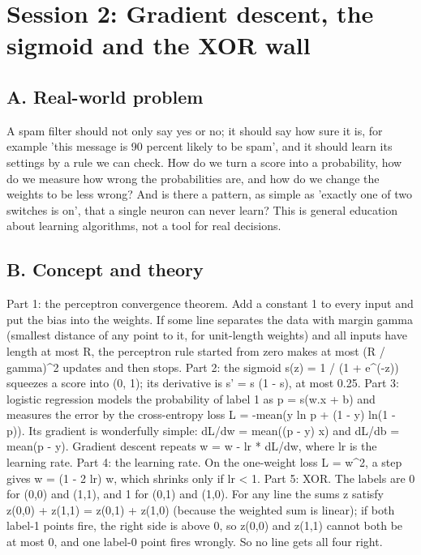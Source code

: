 \documentclass[11pt,a4paper]{article}
\begin{document}
\section{Session 2: Gradient descent, the sigmoid and the XOR wall}

\subsection*{A. Real-world problem}
A spam filter should not only say yes or no; it should say how sure it is, for example 'this message is 90 percent likely to be spam', and it should learn its settings by a rule we can check. How do we turn a score into a probability, how do we measure how wrong the probabilities are, and how do we change the weights to be less wrong? And is there a pattern, as simple as 'exactly one of two switches is on', that a single neuron can never learn? This is general education about learning algorithms, not a tool for real decisions.

\subsection*{B. Concept and theory}
Part 1: the perceptron convergence theorem. Add a constant 1 to every input and put the bias into the weights. If some line separates the data with margin gamma (smallest distance of any point to it, for unit-length weights) and all inputs have length at most R, the perceptron rule started from zero makes at most (R / gamma)\textasciicircum{}2 updates and then stops. Part 2: the sigmoid s(z) = 1 / (1 + e\textasciicircum{}(-z)) squeezes a score into (0, 1); its derivative is s' = s (1 - s), at most 0.25. Part 3: logistic regression models the probability of label 1 as p = s(w.x + b) and measures the error by the cross-entropy loss L = -mean(y ln p + (1 - y) ln(1 - p)). Its gradient is wonderfully simple: dL/dw = mean((p - y) x) and dL/db = mean(p - y). Gradient descent repeats w = w - lr * dL/dw, where lr is the learning rate. Part 4: the learning rate. On the one-weight loss L = w\textasciicircum{}2, a step gives w = (1 - 2 lr) w, which shrinks only if lr \textless{} 1. Part 5: XOR. The labels are 0 for (0,0) and (1,1), and 1 for (0,1) and (1,0). For any line the sums z satisfy z(0,0) + z(1,1) = z(0,1) + z(1,0) (because the weighted sum is linear); if both label-1 points fire, the right side is above 0, so z(0,0) and z(1,1) cannot both be at most 0, and one label-0 point fires wrongly. So no line gets all four right.
\end{document}
